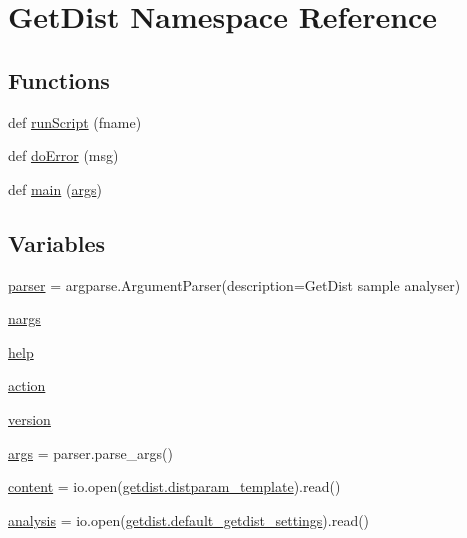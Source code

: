 \hypertarget{namespaceGetDist}{}\section{Get\+Dist Namespace Reference}
\label{namespaceGetDist}
\subsection*{Functions}
\begin{DoxyCompactItemize}
\item 
def \mbox{\hyperlink{namespaceGetDist_a6fd7cad05485639b288731bcf603e40b}{run\+Script}} (fname)
\item 
def \mbox{\hyperlink{namespaceGetDist_a6c4a80c175454d167b12b13c976ef1dd}{do\+Error}} (msg)
\item 
def \mbox{\hyperlink{namespaceGetDist_acc8ec19c3d04e93378678f5ac0f776cf}{main}} (\mbox{\hyperlink{namespaceGetDist_a6ec6fa1fa24cc98a2fb4b80e79b66d74}{args}})
\end{DoxyCompactItemize}
\subsection*{Variables}
\begin{DoxyCompactItemize}
\item 
\mbox{\hyperlink{namespaceGetDist_af6f8a2aba5d1e41e04f4a0fd49ef8cbd}{parser}} = argparse.\+Argument\+Parser(description=\textquotesingle{}Get\+Dist sample analyser\textquotesingle{})
\item 
\mbox{\hyperlink{namespaceGetDist_a9989b0fa529141b1f7481e23ab07f1d1}{nargs}}
\item 
\mbox{\hyperlink{namespaceGetDist_abdea6b3ce3f83b2ac4e0188519314749}{help}}
\item 
\mbox{\hyperlink{namespaceGetDist_ad987e32283ad3cafeefa559e83cfd9b7}{action}}
\item 
\mbox{\hyperlink{namespaceGetDist_a833fd6c176e6cb744e3efc533082b905}{version}}
\item 
\mbox{\hyperlink{namespaceGetDist_a6ec6fa1fa24cc98a2fb4b80e79b66d74}{args}} = parser.\+parse\+\_\+args()
\item 
\mbox{\hyperlink{namespaceGetDist_a805847babed811528a904a25a19dd2d3}{content}} = io.\+open(\mbox{\hyperlink{namespacegetdist_a5d4be353cd53f5baa773acef0b256264}{getdist.\+distparam\+\_\+template}}).read()
\item 
\mbox{\hyperlink{namespaceGetDist_afa77133c94abcbe09dedefa80323eb15}{analysis}} = io.\+open(\mbox{\hyperlink{namespacegetdist_a4940be008227154f9cd2c59d05256103}{getdist.\+default\+\_\+getdist\+\_\+settings}}).read()
\end{DoxyCompactItemize}


